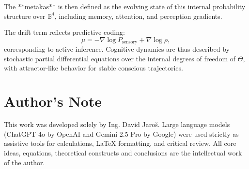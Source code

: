 \documentclass[12pt]{article}
\begin{document}
The **metakas** is then defined as the evolving state of this internal probability structure over \( \mathbb{B}^4 \), including memory, attention, and perception gradients.

The drift term reflects predictive coding:
\[
\mu = -\nabla \log P_\text{sensory} + \nabla \log \rho,
\]
corresponding to active inference. Cognitive dynamics are thus described by stochastic partial differential equations over the internal degrees of freedom of \( \Theta \), with attractor-like behavior for stable conscious trajectories.

\section*{Author's Note}

This work was developed solely by Ing. David Jaroš.  
Large language models (ChatGPT-4o by OpenAI and Gemini 2.5 Pro by Google) were used strictly as assistive tools for calculations, LaTeX formatting, and critical review.  
All core ideas, equations, theoretical constructs and conclusions are the intellectual work of the author.
\end{document}
